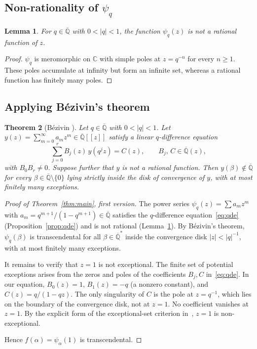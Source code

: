 \documentclass[12pt]{amsart}
\newtheorem{theorem}{Theorem}
\newtheorem{lemma}[theorem]{Lemma}
\theoremstyle{definition}
\theoremstyle{remark}
\begin{document}
\subsection{Non-rationality of $\psi_q$}

\begin{lemma}\label{lem:nonrat}
For $q\in\overline{\mathbb{Q}}$ with $0<|q|<1$, the function
$\psi_q(z)$ is not a rational function of $z$.
\end{lemma}
\begin{proof}
$\psi_q$ is meromorphic on $\mathbb{C}$ with simple poles at
$z=q^{-n}$ for every $n\ge 1$. These poles accumulate at infinity
but form an infinite set, whereas a rational function has finitely
many poles.
\end{proof}

\subsection{Applying B\'ezivin's theorem}

\begin{theorem}[B\'ezivin {\cite{bezivin}}]\label{thm:bez}
Let $q\in\overline{\mathbb{Q}}$ with $0<|q|<1$.
Let $y(z)=\sum_{m=0}^{\infty}a_m z^m\in\overline{\mathbb{Q}}[[z]]$
satisfy a linear $q$-difference equation
\begin{equation}\label{eq:qdegen}
  \sum_{j=0}^{r} B_j(z)\,y(q^j z) = C(z),
  \qquad B_j,\, C \in \overline{\mathbb{Q}}(z),
\end{equation}
with $B_0 B_r\neq 0$. Suppose further that $y$ is not a rational
function. Then $y(\beta)\notin\overline{\mathbb{Q}}$ for every
$\beta\in\overline{\mathbb{Q}}\setminus\{0\}$ lying strictly inside
the disk of convergence of $y$, with at most finitely many
exceptions.
\end{theorem}

\begin{proof}[Proof of Theorem~\ref{thm:main}, first version]
The power series $\psi_q(z)=\sum a_m z^m$ with
$a_m=q^{m+1}/(1-q^{m+1})\in\overline{\mathbb{Q}}$ satisfies the
$q$-difference equation~\eqref{eq:qde} (Proposition~\ref{prop:qde})
and is not rational (Lemma~\ref{lem:nonrat}). By B\'ezivin's
theorem, $\psi_q(\beta)$ is transcendental for all
$\beta\in\overline{\mathbb{Q}}^*$ inside the convergence disk
$|z|<|q|^{-1}$, with at most finitely many exceptions.

It remains to verify that $z=1$ is not exceptional. The finite set
of potential exceptions arises from the zeros and poles of the
coefficients $B_j,C$ in~\eqref{eq:qde}. In our equation, $B_0(z)=1$,
$B_1(z)=-q$ (a nonzero constant), and $C(z)=q/(1-qz)$. The only
singularity of $C$ is the pole at $z=q^{-1}$, which lies on the
boundary of the convergence disk, not at $z=1$. No coefficient
vanishes at $z=1$. By the explicit form of the exceptional-set
criterion in~\cite{bezivin}, $z=1$ is non-exceptional.

Hence $f(\alpha)=\psi_\alpha(1)$ is transcendental.
\end{proof}
\end{document}
